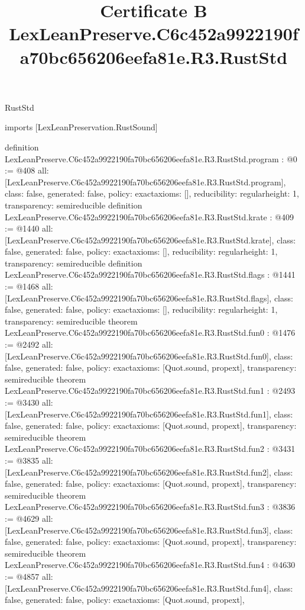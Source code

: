 \begin{lexlean}{RustStd}
\title{Certificate B LexLeanPreserve.C6c452a9922190fa70bc656206eefa81e.R3.RustStd}
\begin{coremodule}
imports [LexLeanPreservation.RustSound]

definition LexLeanPreserve.C6c452a9922190fa70bc656206eefa81e.R3.RustStd.program : @0 := @408 {
  all: [LexLeanPreserve.C6c452a9922190fa70bc656206eefa81e.R3.RustStd.program],
  class: false,
  generated: false,
  policy: exact{axioms: []},
  reducibility: regular{height: 1},
  transparency: semireducible
}
definition LexLeanPreserve.C6c452a9922190fa70bc656206eefa81e.R3.RustStd.krate : @409 := @1440 {
  all: [LexLeanPreserve.C6c452a9922190fa70bc656206eefa81e.R3.RustStd.krate],
  class: false,
  generated: false,
  policy: exact{axioms: []},
  reducibility: regular{height: 1},
  transparency: semireducible
}
definition LexLeanPreserve.C6c452a9922190fa70bc656206eefa81e.R3.RustStd.flags : @1441 := @1468 {
  all: [LexLeanPreserve.C6c452a9922190fa70bc656206eefa81e.R3.RustStd.flags],
  class: false,
  generated: false,
  policy: exact{axioms: []},
  reducibility: regular{height: 1},
  transparency: semireducible
}
theorem LexLeanPreserve.C6c452a9922190fa70bc656206eefa81e.R3.RustStd.fun0 : @1476 := @2492 {
  all: [LexLeanPreserve.C6c452a9922190fa70bc656206eefa81e.R3.RustStd.fun0],
  class: false,
  generated: false,
  policy: exact{axioms: [Quot.sound, propext]},
  transparency: semireducible
}
theorem LexLeanPreserve.C6c452a9922190fa70bc656206eefa81e.R3.RustStd.fun1 : @2493 := @3430 {
  all: [LexLeanPreserve.C6c452a9922190fa70bc656206eefa81e.R3.RustStd.fun1],
  class: false,
  generated: false,
  policy: exact{axioms: [Quot.sound, propext]},
  transparency: semireducible
}
theorem LexLeanPreserve.C6c452a9922190fa70bc656206eefa81e.R3.RustStd.fun2 : @3431 := @3835 {
  all: [LexLeanPreserve.C6c452a9922190fa70bc656206eefa81e.R3.RustStd.fun2],
  class: false,
  generated: false,
  policy: exact{axioms: [Quot.sound, propext]},
  transparency: semireducible
}
theorem LexLeanPreserve.C6c452a9922190fa70bc656206eefa81e.R3.RustStd.fun3 : @3836 := @4629 {
  all: [LexLeanPreserve.C6c452a9922190fa70bc656206eefa81e.R3.RustStd.fun3],
  class: false,
  generated: false,
  policy: exact{axioms: [Quot.sound, propext]},
  transparency: semireducible
}
theorem LexLeanPreserve.C6c452a9922190fa70bc656206eefa81e.R3.RustStd.fun4 : @4630 := @4857 {
  all: [LexLeanPreserve.C6c452a9922190fa70bc656206eefa81e.R3.RustStd.fun4],
  class: false,
  generated: false,
  policy: exact{axioms: [Quot.sound, propext]},
}
\end{coremodule}
\end{lexlean}
